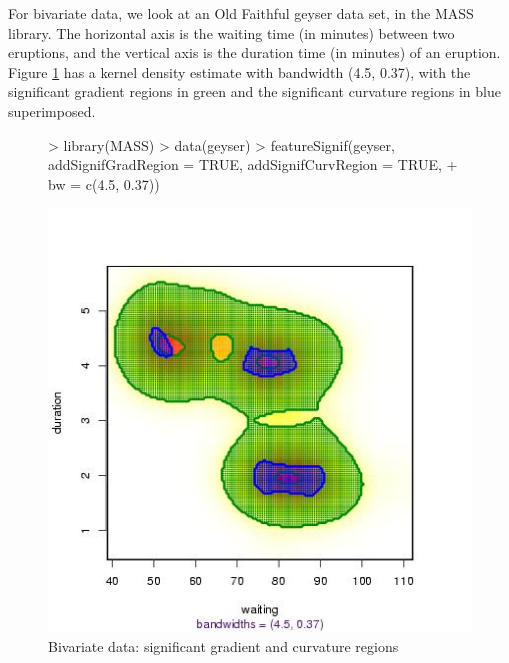 \documentclass[a4paper]{article}
\begin{document}
\clearpage 
For bivariate data, we look at an Old Faithful geyser data set,
in the MASS library. The
horizontal axis is the waiting time (in minutes) between two eruptions, and
the vertical axis is the duration time (in minutes) of an eruption.
Figure \ref{fig:fs4} has a kernel density estimate with
bandwidth (4.5, 0.37),  with the significant gradient regions in green
and the significant curvature regions in blue superimposed.
\begin{figure}[!ht]
\begin{center}
\begin{Schunk}
\begin{Sinput}
> library(MASS)
> data(geyser)
> featureSignif(geyser, addSignifGradRegion = TRUE, addSignifCurvRegion = TRUE, 
+     bw = c(4.5, 0.37))
\end{Sinput}
\end{Schunk}
\includegraphics{feature-003}
\caption{Bivariate data: significant gradient and curvature regions}
\label{fig:fs4}
\end{center}
\end{figure}
\end{document}
